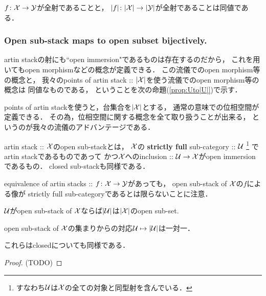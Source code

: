 \begin{Lemma}
    $f \colon \mathcal{X} \to \mathcal{Y}$が全射であることと，
    $|f|\colon |\mathcal{X}| \to |\mathcal{Y}|$が全射であることは同値である．
\end{Lemma}

\subsubsection{Open sub-stack maps to open subset bijectively.}
\begin{Remark}
    artin stackの射にも``open immersion"であるものは存在するのだから，
    これを用いてもopen morphismなどの概念が定義できる．
    この流儀でのopen morphism等の概念と，
    我々のpoints of artin stack :: $|\mathcal{X}|$を使う流儀でのopen morphism等の概念は
    同値なものである，
    ということを次の命題(\ref{prop:Uto|U|})で示す．

    points of artin stackを使うと，台集合を$|\mathcal{X}|$とする，
    通常の意味での位相空間が定義できる．
    その為，位相空間に関する概念を全て取り扱うことが出来る，
    というのが我々の流儀のアドバンテージである．
\end{Remark}

\begin{Def}[\cite{SP} 04YM]
    artin stack :: $\mathcal{X}$のopen sub-stackとは，
    $\mathcal{X}$の \textbf{strictly full} sub-category :: $\mathcal{U}$
    \footnote{ すなわち$\mathcal{U}$は$\mathcal{X}$の全ての対象と同型射を含んでいる． }
    でartin stackであるものであって
    かつ$\mathcal{X}$へのinclusion :: $\mathcal{U} \to \mathcal{X}$がopen immersionであるもの．
    closed sub-stackも同様である．
\end{Def}

\begin{Remark}
    equivalence of artin stacks :: $f \colon \mathcal{X} \to \mathcal{Y}$があっても，
    open sub-stack of $\mathcal{X}$の$f$による像が
    strictly full sub-categoryであるとは限らないことに注意．
\end{Remark}

\begin{Prop}\label{prop:Uto|U|}
\begin{myenum}
    \item $\mathcal{U}$がopen sub-stack of $\mathcal{X}$ならば$|\mathcal{U}|$は$|\mathcal{X}|$のopen sub-set.
    \item open sub-stack of $\mathcal{X}$の集まりからの対応$\mathcal{U} \mapsto |\mathcal{U}|$は一対一．
\end{myenum}
    これらはclosedについても同様である．
\end{Prop}
\begin{proof}
    (TODO)
\end{proof}

